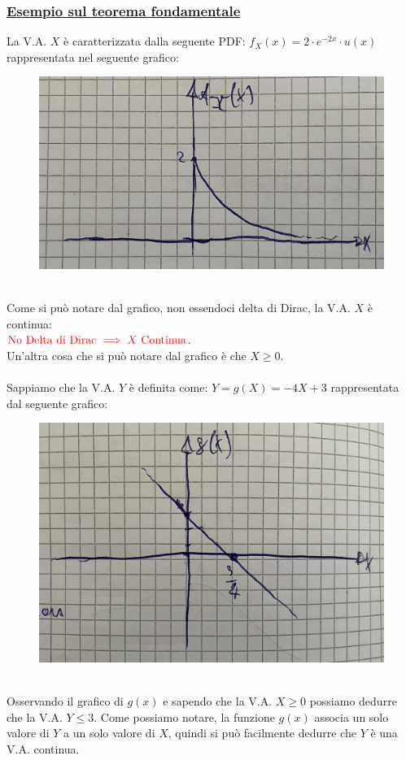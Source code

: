 \documentclass{article}
\begin{document}
\subsubsection{\underline{Esempio sul teorema fondamentale}}
La V.A. $X$ è caratterizzata dalla seguente PDF: $f_X(x) = 2 \cdot e^{-2x}\cdot u(x)$ rappresentata nel seguente grafico:
\begin{figure}[ht]
\centering
\includegraphics[scale=0.10]{images/57.PrimoEsCap5_1.jpeg}
\end{figure} ~\\
Come si può notare dal grafico, non essendoci delta di Dirac, la V.A. $X$ è continua: \\
$\color{red}\text{No Delta di Dirac} \implies X \text{ Continua}$.\\
Un’altra cosa che si può notare dal grafico è che $X \geq 0$. \\ \\
Sappiamo che la V.A. $Y$ è definita come: $Y = g(X) = -4X+3$ rappresentata dal seguente grafico:
\begin{figure}[ht]
\centering
\includegraphics[scale=0.09]{images/58.PrimoEsCap5_2.jpeg}
\end{figure} ~\\
Osservando il grafico di $g(x)$ e sapendo che la V.A. $X \geq 0$ possiamo dedurre che la V.A. $Y \leq 3$.
Come possiamo notare, la funzione $g(x)$ associa un solo valore di $Y$ a un solo valore di $X$, quindi si può facilmente dedurre che $Y$ è una V.A. continua.
\end{document}
